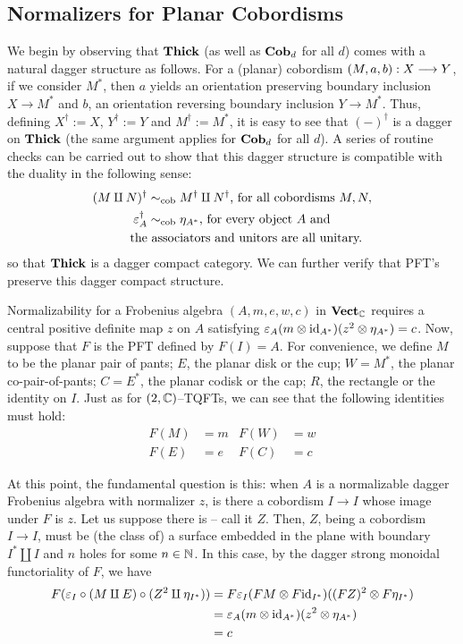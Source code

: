 
\subsection{Normalizers for Planar Cobordisms}\label{pft}

We begin by observing that $\textbf{Thick}$ (as well as $\textbf{Cob}_d$ for all $d$) comes with
a natural dagger structure as follows. For a (planar) cobordism
$(M, a, b) : X \stackrel{}{\longrightarrow} Y$, if we consider $M^*$, then $a$ yields an orientation
preserving boundary inclusion $X \to M^*$ and $b$, an orientation reversing
boundary inclusion $Y \to M^*$. Thus, defining
$X^{\dagger} := X$, $Y^{\dagger} := Y$ and $M^{\dagger} := M^*$, it is easy to
see that $(-)^{\dagger}$ is a dagger on $\textbf{Thick}$ (the same argument applies for
$\textbf{Cob}_d$ for all $d$). A series of routine checks can be carried out to show
that this dagger structure is compatible with the duality in the following
sense:
\begin{align*}
(M \amalg N)^{\dagger} &\sim_{\text{cob}} M^{\dagger} \amalg N^{\dagger}
  \text{, for all cobordisms } M, N, \\
\varepsilon_{A}^{\dagger} &\sim_{\text{cob}} \eta_{A^*}
  \text{, for every object } A \text{ and} \\
\text{the} & \text{ associators and unitors are all unitary.}
\end{align*}
so that $\textbf{Thick}$ is a dagger compact category. We can further verify that PFT's
preserve this dagger compact structure. 

Normalizability for a Frobenius algebra $(A, m, e, w, c)$ in $\textbf{Vect}_{\mathbb{C}}$
requires a central positive definite map $z$ on $A$ satisfying
$\varepsilon_A(m \otimes \text{id}_{A^*})(z^2 \otimes \eta_{A^*}) = c$. Now, suppose that $F$ is
the PFT defined by $F(I) = A$. For convenience, we define $M$ to be the planar
pair of pants; $E$, the planar disk or the cup; $W = M^*$, the planar
co-pair-of-pants; $C = E^*$, the planar codisk or the cap; $R$, the rectangle or
the identity on $I$. Just as for $(2, \mathbb{C})$--TQFTs, we can see that the following
identities must hold:
\begin{align*}
  F(M) &= m &
  F(W) &= w \\
  F(E) &= e &
  F(C) &= c
\end{align*}

At this point, the fundamental question is this: when $A$ is a normalizable
dagger Frobenius algebra with normalizer $z$, is there a cobordism $I \to I$
whose image under $F$ is $z$. Let us suppose there is -- call it $Z$. Then, $Z$,
being a cobordism $I \to I$, must be (the class of) a surface embedded in the
plane with boundary $I^* \amalg I$ and $n$ holes for some $n \in \mathbb{N}$. In this
case, by the dagger strong monoidal functoriality of $F$, we have
\begin{align*}
F(\varepsilon_{I} \circ (M \amalg E) \circ (Z^2 \amalg \eta_{I^*}))
  &= F\varepsilon_I(FM \otimes F\text{id}_{I^*})((FZ)^2 \otimes F\eta_{I^*})\\
  &= \varepsilon_{A}(m \otimes \text{id}_{A^*})(z^2 \otimes \eta_{A^*})\\
  &= c
\end{align*}

